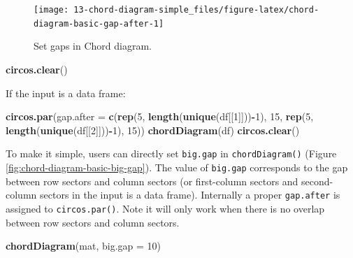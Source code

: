 \documentclass[]{book}
\newenvironment{Shaded}{\begin{snugshade}}{\end{snugshade}}
\newcommand{\KeywordTok}[1]{\textcolor[rgb]{0.13,0.29,0.53}{\textbf{#1}}}
\newcommand{\DataTypeTok}[1]{\textcolor[rgb]{0.13,0.29,0.53}{#1}}
\newcommand{\DecValTok}[1]{\textcolor[rgb]{0.00,0.00,0.81}{#1}}
\newcommand{\OperatorTok}[1]{\textcolor[rgb]{0.81,0.36,0.00}{\textbf{#1}}}
\newcommand{\NormalTok}[1]{#1}
\begin{document}
\begin{figure}

{\centering \texttt{[image: 13-chord-diagram-simple\_files/figure-latex/chord-diagram-basic-gap-after-1]} 

}

\caption{Set gaps in Chord diagram.}\label{fig:chord-diagram-basic-gap-after}
\end{figure}

\begin{Shaded}
\begin{Highlighting}[]
\KeywordTok{circos.clear}\NormalTok{()}
\end{Highlighting}
\end{Shaded}

If the input is a data frame:

\begin{Shaded}
\begin{Highlighting}[]
\KeywordTok{circos.par}\NormalTok{(}\DataTypeTok{gap.after =} \KeywordTok{c}\NormalTok{(}\KeywordTok{rep}\NormalTok{(}\DecValTok{5}\NormalTok{, }\KeywordTok{length}\NormalTok{(}\KeywordTok{unique}\NormalTok{(df[[}\DecValTok{1}\NormalTok{]]))}\OperatorTok{-}\DecValTok{1}\NormalTok{), }\DecValTok{15}\NormalTok{, }
                         \KeywordTok{rep}\NormalTok{(}\DecValTok{5}\NormalTok{, }\KeywordTok{length}\NormalTok{(}\KeywordTok{unique}\NormalTok{(df[[}\DecValTok{2}\NormalTok{]]))}\OperatorTok{-}\DecValTok{1}\NormalTok{), }\DecValTok{15}\NormalTok{))}
\KeywordTok{chordDiagram}\NormalTok{(df)}
\KeywordTok{circos.clear}\NormalTok{()}
\end{Highlighting}
\end{Shaded}

To make it simple, users can directly set \texttt{big.gap} in
\texttt{chordDiagram()} (Figure \ref{fig:chord-diagram-basic-big-gap}).
The value of \texttt{big.gap} corresponds to the gap between row sectors
and column sectors (or first-column sectors and second-column sectors in
the input is a data frame). Internally a proper \texttt{gap.after} is
assigned to \texttt{circos.par()}. Note it will only work when there is
no overlap between row sectors and column sectors.

\begin{Shaded}
\begin{Highlighting}[]
\KeywordTok{chordDiagram}\NormalTok{(mat, }\DataTypeTok{big.gap =} \DecValTok{10}\NormalTok{)}
\end{Highlighting}
\end{Shaded}
\end{document}
